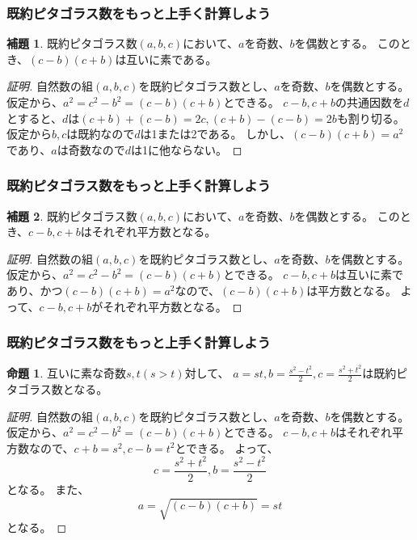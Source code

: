 \documentclass[dvipdfmx,11pt,notheorems]{beamer}
\theoremstyle{definition}
\newtheorem{proposition}{命題}
\newtheorem{lemma}{補題}
\begin{document}
\begin{frame}\frametitle{既約ピタゴラス数をもっと上手く計算しよう}
\begin{lemma}
既約ピタゴラス数$(a, b, c)$において、$a$を奇数、$b$を偶数とする。
このとき、$(c-b)(c+b)$は互いに素である。
\end{lemma}

\begin{proof}[証明]
自然数の組$(a, b, c)$を既約ピタゴラス数とし、$a$を奇数、$b$を偶数とする。
仮定から、$a^{2} = c^{2} -b^{2} = (c-b)(c+b)$とできる。
$c-b, c+b$の共通因数を$d$とすると、$d$は$(c+b)+(c-b)=2c, (c+b)-(c-b)=2b$も割り切る。
仮定から$b, c$は既約なので$d$は1または2である。
しかし、$(c-b)(c+b)=a^{2}$であり、$a$は奇数なので$d$は1に他ならない。

\end{proof}

\end{frame}

\begin{frame}\frametitle{既約ピタゴラス数をもっと上手く計算しよう}
\begin{lemma}
既約ピタゴラス数$(a, b, c)$において、$a$を奇数、$b$を偶数とする。
このとき、$c-b, c+b$はそれぞれ平方数となる。
\end{lemma}

\begin{proof}[証明]
自然数の組$(a, b, c)$を既約ピタゴラス数とし、$a$を奇数、$b$を偶数とする。
仮定から、$a^{2} = c^{2} -b^{2} = (c-b)(c+b)$とできる。
$c-b, c+b$は互いに素であり、かつ$(c-b)(c+b)=a^{2}$なので、$(c-b)(c+b)$は平方数となる。
よって、$c-b, c+b$がそれぞれ平方数となる。
\end{proof}

\end{frame}


\begin{frame}\frametitle{既約ピタゴラス数をもっと上手く計算しよう}

\begin{proposition}
互いに素な奇数$s, t (s > t)$対して、 $a = st, b = \displaystyle \frac{s^{2}-t^{2}}{2}, c = \displaystyle \frac{s^{2}+t^{2}}{2}$は既約ピタゴラス数となる。
\end{proposition}

\begin{proof}[証明]
自然数の組$(a, b, c)$を既約ピタゴラス数とし、$a$を奇数、$b$を偶数とする。
仮定から、$a^{2} = c^{2} -b^{2} = (c-b)(c+b)$とできる。
$c-b, c+b$はそれぞれ平方数なので、$c+b=s^{2}, c-b=t^{2}$とできる。
よって、
\begin{equation*}
c = \frac{s^{2} + t^{2}}{2}, b = \frac{s^{2} - t^{2}}{2}
\end{equation*}
となる。
また、
\begin{equation*}
a = \sqrt{(c-b)(c+b)} = st
\end{equation*}
となる。
\end{proof}

\end{frame}
\end{document}
